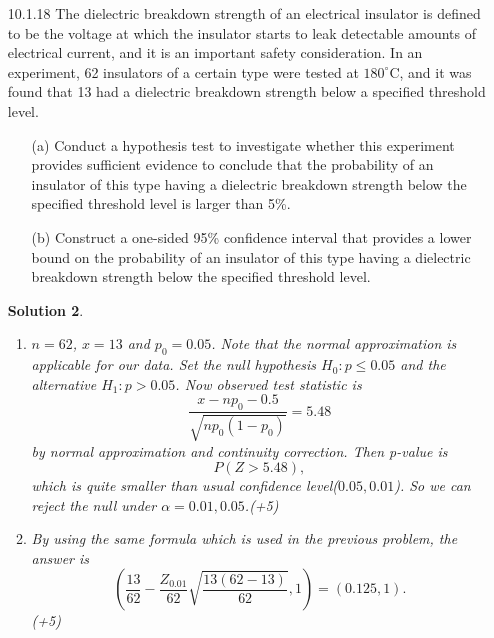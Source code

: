 \documentclass[a4paper,10pt]{article}
\newtheorem*{sol}{Solution}
\begin{document}
\begin{itemize}
\begin{sol}
	\qed
\end{sol}

\item [10.1.18] The dielectric breakdown strength of an electrical
insulator is defined to be the voltage at which the
insulator starts to leak detectable amounts of electrical
current, and it is an important safety consideration. In
an experiment, 62 insulators of a certain type were
tested at $180^{\circ}$C, and it was found that 13 had a
dielectric breakdown strength below a specified
threshold level.
\begin{enumerate}
	\item [(a)] Conduct a hypothesis test to investigate whether this
	experiment provides sufficient evidence to conclude
	that the probability of an insulator of this type
	having a dielectric breakdown strength below the
	specified threshold level is larger than 5\%.
	\item [(b)]Construct a one-sided 95\% confidence interval that
	provides a lower bound on the probability of an
	insulator of this type having a dielectric breakdown
	strength below the specified threshold level.
\end{enumerate}
\begin{sol}
	\begin{enumerate}[label = (\alph*)]
		\item $n= 62$, $x = 13$ and $p_0 = 0.05$.
			Note that the normal approximation is applicable for our data.
			Set the null hypothesis $H_0: p \le 0.05$ and the alternative $H_1: p > 0.05$.
			Now observed test statistic is
			\[
				\frac{x- np_0 - 0.5}{\sqrt{np_0(1-p_0)}} = 5.48
			\]
			by normal approximation and continuity correction.
			Then p-value is
			\[
				P(Z > 5.48),
			\]
			which is quite smaller than usual confidence level($0.05, 0.01$).
			So we can reject the null under $\alpha = 0.01, 0.05$.(+5)

		\item By using the same formula which is used in the previous problem,
			the answer is
			\[
				\left( \frac{13}{62} - \frac{Z_{0.01}}{62}\sqrt{\frac{13(62-13)}{62}}, 1 \right)
				 = (0.125, 1).
			 \](+5)
	\end{enumerate}
	

\end{sol}
\end{itemize}
\end{document}
